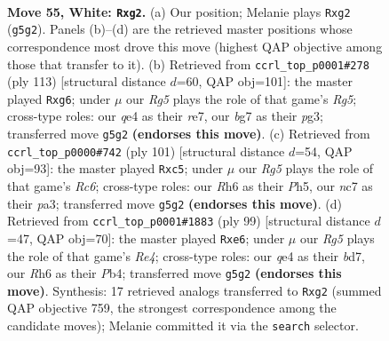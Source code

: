 \documentclass[11pt]{article}
\begin{document}
\clearpage

\begin{figure}[p]\centering
\begin{subfigure}{0.46\textwidth}\centering
\resizebox{\linewidth}{!}{%
\newchessgame
\chessboard[
  setfen={6k1/2n2pb1/7R/3P2R1/4q3/8/6r1/6K1 w - - 0 55},
  showmover=false,
  pgfstyle=straightmove, color=movearrow, markmove={g5-g2}
]}
\caption{}
\end{subfigure}\hfill
\begin{subfigure}{0.46\textwidth}\centering
\resizebox{\linewidth}{!}{%
\newchessgame
\chessboard[
  setfen={8/4R3/6Rk/7p/6r1/6P1/6K1/8 b - - 0 57},
  showmover=false,
  pgfstyle=straightmove, color=movearrow, markmove={g4-g6}
]}
\caption{}
\end{subfigure}
\\[4pt]
\begin{subfigure}{0.46\textwidth}\centering
\resizebox{\linewidth}{!}{%
\newchessgame
\chessboard[
  setfen={8/8/8/2Rk3p/p7/P1rNK2P/8/8 b - - 0 51},
  showmover=false,
  pgfstyle=straightmove, color=movearrow, markmove={c3-c5}
]}
\caption{}
\end{subfigure}\hfill
\begin{subfigure}{0.46\textwidth}\centering
\resizebox{\linewidth}{!}{%
\newchessgame
\chessboard[
  setfen={8/3Bk3/4R3/4r3/1pp3P1/5K2/1P6/8 b - - 0 50},
  showmover=false,
  pgfstyle=straightmove, color=movearrow, markmove={e5-e6}
]}
\caption{}
\end{subfigure}
\caption{\textbf{Move 55, White: \texttt{Rxg2}.} (a) Our position; Melanie plays \texttt{Rxg2} (\texttt{g5g2}). Panels (b)--(d) are the retrieved master positions whose correspondence most drove this move (highest QAP objective among those that transfer to it). (b) Retrieved from \texttt{ccrl\_top\_p0001\#278} (ply 113) [structural distance $d$=60, QAP obj=101]: the master played \texttt{Rxg6}; under $\mu$ our \emph{Rg5} plays the role of that game's \emph{Rg5}; cross-type roles: our \emph{q}e4 as their \emph{r}e7, our \emph{b}g7 as their \emph{p}g3; transferred move \texttt{g5g2} \textbf{(endorses this move)}. (c) Retrieved from \texttt{ccrl\_top\_p0000\#742} (ply 101) [structural distance $d$=54, QAP obj=93]: the master played \texttt{Rxc5}; under $\mu$ our \emph{Rg5} plays the role of that game's \emph{Rc6}; cross-type roles: our \emph{R}h6 as their \emph{P}h5, our \emph{n}c7 as their \emph{p}a3; transferred move \texttt{g5g2} \textbf{(endorses this move)}. (d) Retrieved from \texttt{ccrl\_top\_p0001\#1883} (ply 99) [structural distance $d$=47, QAP obj=70]: the master played \texttt{Rxe6}; under $\mu$ our \emph{Rg5} plays the role of that game's \emph{Re4}; cross-type roles: our \emph{q}e4 as their \emph{b}d7, our \emph{R}h6 as their \emph{P}b4; transferred move \texttt{g5g2} \textbf{(endorses this move)}. Synthesis: 17 retrieved analogs transferred to \texttt{Rxg2} (summed QAP objective 759, the strongest correspondence among the candidate moves); Melanie committed it via the \texttt{search} selector.}
\label{fig:thought-m108}
\end{figure}
\end{document}
